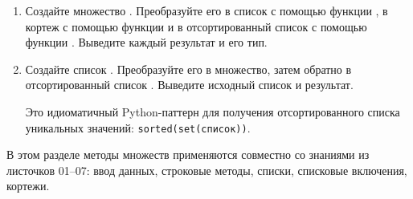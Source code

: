 \documentclass[a4,12pt]{article}
\theoremstyle{remark}
\begin{document}
\begin{enumerate}[resume]

    \item Создайте множество {}. Преобразуйте его в список с помощью функции {}, в кортеж с помощью функции {} и в отсортированный список с помощью функции {}. Выведите каждый результат и его тип.

    \item Создайте список {}. Преобразуйте его в множество, затем обратно в отсортированный список {}. Выведите исходный список и результат.

    \begin{exercisecomment}
    Это идиоматичный Python-паттерн для получения отсортированного
    списка уникальных значений: \texttt{sorted(set(список))}.
    \end{exercisecomment}

\end{enumerate}

\begin{exercisecomment}[title=Раздел 7. Связь с пройденными темами]
В этом разделе методы множеств применяются совместно со знаниями из листочков 01--07:
ввод данных, строковые методы, списки, списковые включения, кортежи.
\end{exercisecomment}
\end{document}
